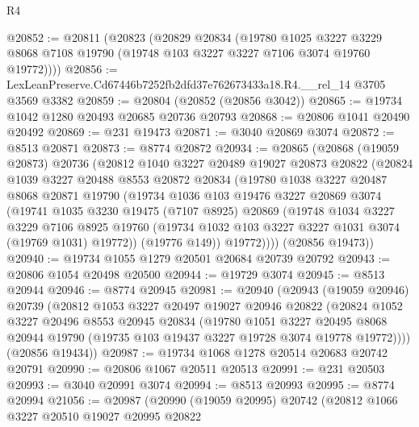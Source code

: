 \begin{lexlean}{R4}
\begin{coremodule}
@20852 := @20811
    (@20823
      (@20829
        @20834
        (@19780
          @1025
          @3227
          @3229
          @8068
          @7108
          @19790
          (@19748 @103 @3227 @3227 @7106 @3074 @19760 @19772))))
@20856 := LexLeanPreserve.Cd67446b7252fb2dfd37e762673433a18.R4.__rel_14 @3705 @3569 @3382
@20859 := @20804 (@20852 (@20856 @3042))
@20865 := @19734 @1042 @1280 @20493 @20685 @20736 @20793
@20868 := @20806 @1041 @20490 @20492
@20869 := @231 @19473
@20871 := @3040 @20869 @3074
@20872 := @8513 @20871
@20873 := @8774 @20872
@20934 := @20865
    (@20868
      (@19059 @20873)
      @20736
      (@20812
        @1040
        @3227
        @20489
        @19027
        @20873
        @20822
        (@20824
          @1039
          @3227
          @20488
          @8553
          @20872
          @20834
          (@19780
            @1038
            @3227
            @20487
            @8068
            @20871
            @19790
            (@19734
              @1036
              @103
              @19476
              @3227
              @20869
              @3074
              (@19741
                @1035
                @3230
                @19475
                (@7107 @8925)
                @20869
                (@19748
                  @1034
                  @3227
                  @3229
                  @7106
                  @8925
                  @19760
                  (@19734 @1032 @103 @3227 @3227 @1031 @3074 (@19769 @1031) @19772))
                (@19776 @149))
              @19772))))
      (@20856 @19473))
@20940 := @19734 @1055 @1279 @20501 @20684 @20739 @20792
@20943 := @20806 @1054 @20498 @20500
@20944 := @19729 @3074
@20945 := @8513 @20944
@20946 := @8774 @20945
@20981 := @20940
    (@20943
      (@19059 @20946)
      @20739
      (@20812
        @1053
        @3227
        @20497
        @19027
        @20946
        @20822
        (@20824
          @1052
          @3227
          @20496
          @8553
          @20945
          @20834
          (@19780
            @1051
            @3227
            @20495
            @8068
            @20944
            @19790
            (@19735 @103 @19437 @3227 @19728 @3074 @19778 @19772))))
      (@20856 @19434))
@20987 := @19734 @1068 @1278 @20514 @20683 @20742 @20791
@20990 := @20806 @1067 @20511 @20513
@20991 := @231 @20503
@20993 := @3040 @20991 @3074
@20994 := @8513 @20993
@20995 := @8774 @20994
@21056 := @20987
    (@20990
      (@19059 @20995)
      @20742
      (@20812
        @1066
        @3227
        @20510
        @19027
        @20995
        @20822

\end{coremodule}
\end{lexlean}
